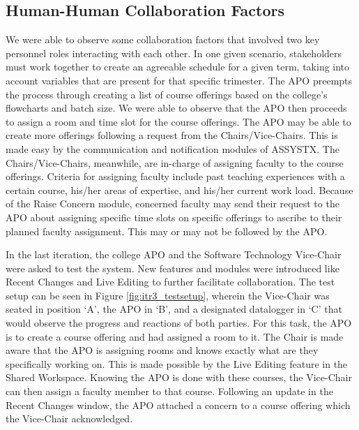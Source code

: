 \subsection{Human-Human Collaboration Factors}
We were able to observe some collaboration factors that involved two key personnel roles interacting with each other. In one given scenario, stakeholders must work together to create an agreeable schedule for a given term, taking into account variables that are present for that specific trimester. The APO preempts the process through creating a list of course offerings based on the college's flowcharts and batch size. We were able to observe that the APO then proceeds to assign a room and time slot for the course offerings. The APO may be able to create more offerings following a request from the Chairs/Vice-Chairs. This is made easy by the communication and notification modules of ASSYSTX. The Chairs/Vice-Chairs, meanwhile, are in-charge of assigning faculty to the course offerings. Criteria for assigning faculty include past teaching experiences with a certain course, his/her areas of expertise, and his/her current work load. Because of the Raise Concern module, concerned faculty may send their request to the APO about assigning specific time slots on specific offerings to ascribe to their planned faculty assignment. This may or may not be followed by the APO. 

In the last iteration, the college APO and the Software Technology Vice-Chair were asked to test the system. New features and modules were introduced like Recent Changes and Live Editing to further facilitate collaboration. The test setup can be seen in Figure \ref{fig:itr3_testsetup}, wherein the Vice-Chair was seated in position `A', the APO in `B', and a designated datalogger in `C' that would observe the progress and reactions of both parties. For this task, the APO is to create a course offering and had assigned a room to it. The Chair is made aware that the APO is assigning rooms and knows exactly what are they specifically working on. This is made possible by the Live Editing feature in the Shared Workspace. Knowing the APO is done with these courses, the Vice-Chair can then assign a faculty member to that course. Following an update in the Recent Changes window, the APO attached a concern to a course offering which the Vice-Chair acknowledged.


